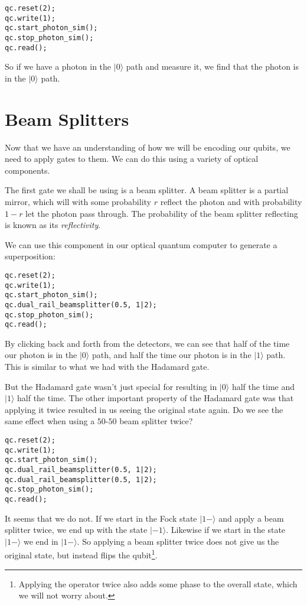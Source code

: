 \documentclass[twocolumn]{article}
\begin{document}
\begin{lstlisting}
qc.reset(2);
qc.write(1);
qc.start_photon_sim();
qc.stop_photon_sim();
qc.read();
\end{lstlisting}

So if we have a photon in the $|0\rangle$ path and measure it, we find that the photon is in the $|0\rangle$ path.

\section{Beam Splitters}

Now that we have an understanding of how we will be encoding our qubits, we need to apply gates to them. We can do this using a variety of optical components.

The first gate we shall be using is a beam splitter. A beam splitter is a partial mirror, which will with some probability $r$ reflect the photon and with probability $1 - r$ let the photon pass through. The probability of the beam splitter reflecting is known as its {\em reflectivity}.

We can use this component in our optical quantum computer to generate a superposition:

\begin{lstlisting}
qc.reset(2);
qc.write(1);
qc.start_photon_sim();
qc.dual_rail_beamsplitter(0.5, 1|2);
qc.stop_photon_sim();
qc.read();
\end{lstlisting}

By clicking back and forth from the detectors, we can see that half of the time  our photon is in the $|0\rangle$ path, and half the time our photon is in the $|1\rangle$ path. This is similar to what we had with the Hadamard gate.

But the Hadamard gate wasn't just special for resulting in $|0\rangle$ half the time and $|1\rangle$ half the time. The other important property of the Hadamard gate was that applying it twice resulted in us seeing the original state again. Do we see the same effect when using a $50$-$50$ beam splitter twice?

\begin{lstlisting}
qc.reset(2);
qc.write(1);
qc.start_photon_sim();
qc.dual_rail_beamsplitter(0.5, 1|2);
qc.dual_rail_beamsplitter(0.5, 1|2);
qc.stop_photon_sim();
qc.read();
\end{lstlisting}

It seems that we do not. If we start in the Fock state $|1-\rangle$ and apply a beam splitter twice, we end up with the state $|-1\rangle$. Likewise if we start in the state $|1-\rangle$ we end in $|1-\rangle$. So applying a beam splitter twice does not give us the original state, but instead flips the qubit\footnote{Applying the operator twice also adds some phase to the overall state, which we will not worry about.}.
\end{document}

